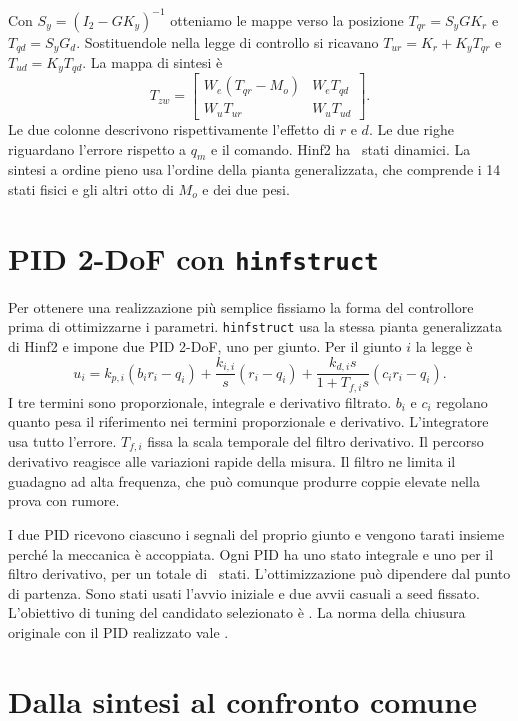 Con $S_y=(I_2-GK_y)^{-1}$ otteniamo le mappe verso la posizione
$T_{qr}=S_yGK_r$ e $T_{qd}=S_yG_d$. Sostituendole nella legge
di controllo si ricavano $T_{ur}=K_r+K_yT_{qr}$ e
$T_{ud}=K_yT_{qd}$. La mappa di sintesi è
\begin{equation}\label{eq:twodofweighted}
 T_{zw}=\begin{bmatrix}
 W_e(T_{qr}-M_o)&W_eT_{qd}\\W_uT_{ur}&W_uT_{ud}
 \end{bmatrix}.
\end{equation}
Le due colonne descrivono rispettivamente l'effetto di $r$ e $d$.
Le due righe riguardano l'errore rispetto a $q_m$ e il comando.
Hinf2 ha \FinHinfTwoOrdine\ stati dinamici. La sintesi a ordine
pieno usa l'ordine della pianta generalizzata, che comprende i
14 stati fisici e gli altri otto di $M_o$ e dei due pesi.

\section{PID 2-DoF con \texttt{hinfstruct}}

Per ottenere una realizzazione più semplice fissiamo la forma del
controllore prima di ottimizzarne i parametri. \texttt{hinfstruct}
usa la stessa pianta generalizzata di Hinf2 e impone due PID 2-DoF,
uno per giunto. Per il giunto $i$ la legge è
\[
 u_i=k_{p,i}(b_i r_i-q_i)+\frac{k_{i,i}}{s}(r_i-q_i)
 +\frac{k_{d,i}s}{1+T_{f,i}s}(c_i r_i-q_i).
\]
I tre termini sono proporzionale, integrale e derivativo filtrato.
$b_i$ e $c_i$ regolano quanto pesa il riferimento nei termini
proporzionale e derivativo. L'integratore usa tutto l'errore.
$T_{f,i}$ fissa la scala temporale del filtro derivativo. Il percorso derivativo reagisce alle variazioni rapide della
misura. Il filtro ne limita il guadagno ad alta frequenza, che
può comunque produrre coppie elevate nella prova con rumore.

I due PID ricevono ciascuno i segnali del proprio giunto e vengono
tarati insieme perché la meccanica è accoppiata. Ogni PID ha uno
stato integrale e uno per il filtro derivativo, per un totale di
\FinPIDOrdine\ stati. L'ottimizzazione può dipendere dal punto di
partenza. Sono stati usati l'avvio iniziale e due avvii casuali
a seed fissato. L'obiettivo di tuning del candidato selezionato è
\FinGammaPID. La norma della chiusura originale con il PID
realizzato vale \FinPIDNorma.

\section{Dalla sintesi al confronto comune}

